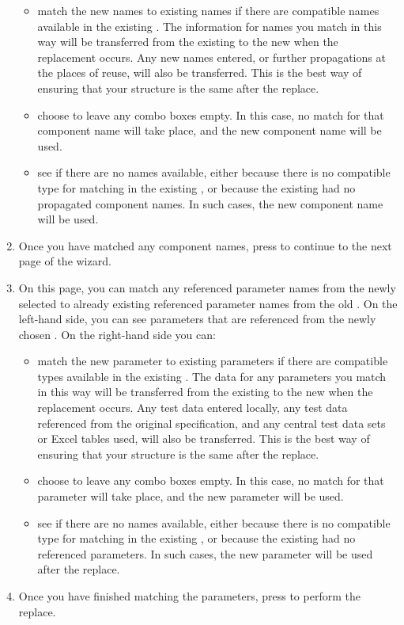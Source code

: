 \begin{enumerate}
\begin{itemize}
\item  match the new names to existing names if there are compatible names available in the existing \gdcase{}. The information for names you match in this way will be transferred from the existing \gdcase{} to the new \gdcase{} when the replacement occurs. Any new names entered, or further propagations at the places of reuse, will also be transferred. This is the best way of ensuring that your \gdproject{} structure is the same after the replace. 
\item choose to leave any combo boxes empty. In this case, no match for that component name will take place, and the new component name will be used. 
\item see if there are no names available, either because there is no compatible type for matching in the existing \gdcase{}, or because the existing \gdcase{} had no propagated component names. In such cases, the new component name will be used.
\end{itemize}
\item Once you have matched any component names, press  to continue to the next page of the wizard.
\item On this page, you can match any referenced parameter names  from the newly selected \gdcase{} to already existing referenced parameter names from the old \gdcase{}. On the left-hand side, you can see parameters that are referenced from the newly chosen \gdcase{}. On the right-hand side you can:
\begin{itemize}
\item  match the new parameter to existing parameters if there are compatible types available in the existing \gdcase{}. The data for any parameters you match in this way will be transferred from the existing \gdcase{} to the new \gdcase{} when the replacement occurs. Any test data entered locally, any test data referenced from the original specification, and any central test data sets or Excel tables used, will also be transferred. This is the best way of ensuring that your \gdproject{} structure is the same after the replace. 
\item choose to leave any combo boxes empty. In this case, no match for that parameter will take place, and the new parameter will be used. 
\item see if there are no names available, either because there is no compatible type for matching in the existing \gdcase{}, or because the existing \gdcase{} had no referenced parameters. In such cases, the new parameter will be used after the replace.
\end{itemize}
\item Once you have finished matching the parameters, press  to perform the replace.
\end{enumerate}
